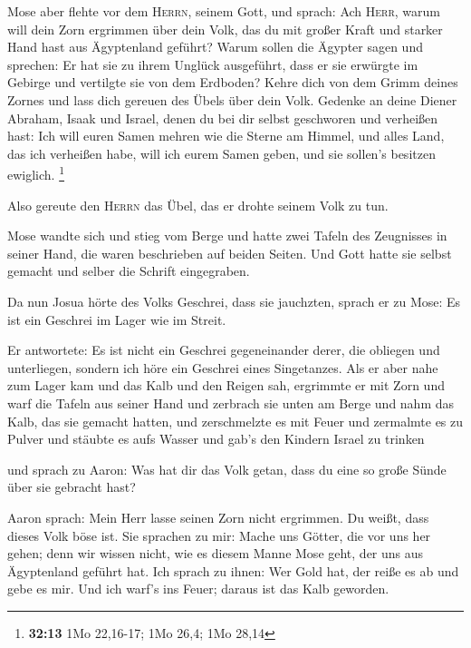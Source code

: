  Mose aber flehte vor dem \textsc{Herrn}, seinem Gott,
und sprach: Ach \textsc{Herr}, warum will dein Zorn ergrimmen über dein
Volk, das du mit großer Kraft und starker Hand hast aus Ägyptenland
geführt?  Warum sollen die Ägypter sagen und sprechen: Er
hat sie zu ihrem Unglück ausgeführt, dass er sie erwürgte im Gebirge und
vertilgte sie von dem Erdboden? Kehre dich von dem Grimm deines Zornes
und lass dich gereuen des Übels über dein Volk.  Gedenke
an deine Diener Abraham, Isaak und Israel, denen du bei dir selbst
geschworen und verheißen hast: Ich will euren Samen mehren wie die
Sterne am Himmel, und alles Land, das ich verheißen habe, will ich eurem
Samen geben, und sie sollen's besitzen ewiglich. \footnote{\textbf{32:13}
  1Mo 22,16-17; 1Mo 26,4; 1Mo 28,14}

 Also gereute den \textsc{Herrn} das Übel, das er drohte
seinem Volk zu tun.

 Mose wandte sich und stieg vom Berge und hatte zwei
Tafeln des Zeugnisses in seiner Hand, die waren beschrieben auf beiden
Seiten.  Und Gott hatte sie selbst gemacht und selber die
Schrift eingegraben.

 Da nun Josua hörte des Volks Geschrei, dass sie
jauchzten, sprach er zu Mose: Es ist ein Geschrei im Lager wie im
Streit.

 Er antwortete: Es ist nicht ein Geschrei gegeneinander
derer, die obliegen und unterliegen, sondern ich höre ein Geschrei eines
Singetanzes.  Als er aber nahe zum Lager kam und das Kalb
und den Reigen sah, ergrimmte er mit Zorn und warf die Tafeln aus seiner
Hand und zerbrach sie unten am Berge  und nahm das Kalb,
das sie gemacht hatten, und zerschmelzte es mit Feuer und zermalmte es
zu Pulver und stäubte es aufs Wasser und gab's den Kindern Israel zu
trinken

 und sprach zu Aaron: Was hat dir das Volk getan, dass du
eine so große Sünde über sie gebracht hast?

 Aaron sprach: Mein Herr lasse seinen Zorn nicht
ergrimmen. Du weißt, dass dieses Volk böse ist.  Sie
sprachen zu mir: Mache uns Götter, die vor uns her gehen; denn wir
wissen nicht, wie es diesem Manne Mose geht, der uns aus Ägyptenland
geführt hat.  Ich sprach zu ihnen: Wer Gold hat, der
reiße es ab und gebe es mir. Und ich warf's ins Feuer; daraus ist das
Kalb geworden.

